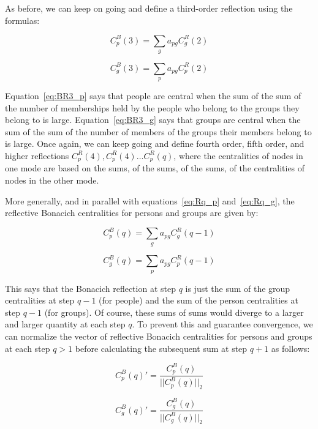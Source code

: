 \documentclass[a4paper,fleqn]{cas-sc}
\begin{document}
As before, we can keep on going and define a third-order reflection using the formulas:

\begin{equation}
   C^B_p(3) = \sum_g a_{pg}C^R_g(2)
   \label{eq:BR3_p}
\end{equation} 

\begin{equation}
   C^B_g(3) = \sum_p a_{pg}C^R_p(2)
   \label{eq:BR3_g}
\end{equation}

Equation~\ref{eq:BR3_p} says that people are central when the sum of the sum of the number of memberships held by the people who belong to the groups they belong to is large. Equation~\ref{eq:BR3_g} says that groups are central when the sum of the sum of the number of members of the groups their members belong to is large. Once again, we can keep going and define fourth order, fifth order, and higher reflections $C^R_p(4), C^R_p(4) \ldots C^R_p(q)$, where the centralities of nodes in one mode are based on the sums, of the sums, of the sums, of the centralities of nodes in the other mode.

More generally, and in parallel with equations~\ref{eq:Rq_p} and~\ref{eq:Rq_g}, the reflective Bonacich centralities for persons and groups are given by:

\begin{equation}
   C^B_p(q) = \sum_g a_{pg}C^R_g(q-1)
   \label{eq:BRq_p}
\end{equation} 

\begin{equation}
   C^B_g(q) = \sum_p a_{pg}C^R_p(q-1)
   \label{eq:BRq_g}
\end{equation} 

This says that the Bonacich reflection at step $q$ is just the sum of the group centralities at step $q-1$ (for people) and the sum of the person centralities at step $q-1$ (for groups). Of course, these sums of sums would diverge to a larger and larger quantity at each step $q$. To prevent this and guarantee convergence, we can normalize the vector of reflective Bonacich centralities for persons and groups at each step $q > 1$ before calculating the subsequent sum at step $q+1$ as follows:

\begin{equation}
   C^B_p(q)' = \frac{C^B_p(q)}{||C^B_p(q)||_2}
   \label{eq:BRq_pn}
\end{equation} 

\begin{equation}
   C^B_g(q)' = \frac{C^B_g(q)}{||C^B_g(q)||_2}
   \label{eq:BRq_gn}
\end{equation} 
\end{document}
